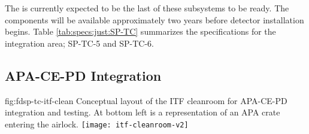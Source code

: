 The  is currently expected to be the last of these subsystems to be ready. The  components will be available approximately two years before detector installation begins. %
Table \ref{tab:specs:just:SP-TC} summarizes the specifications for the %
integration area;  SP-TC-5 and SP-TC-6.






\subsection{APA-CE-PD Integration}
\label{sec:fdsp-tc-itf-integ}

\begin{dunefigure}{fig:fdsp-tc-itf-clean}
{Conceptual layout of the ITF cleanroom for APA-CE-PD integration and testing. At bottom left is a representation of an APA crate entering the airlock.}
\texttt{[image: itf-cleanroom-v2]}
\end{dunefigure}

